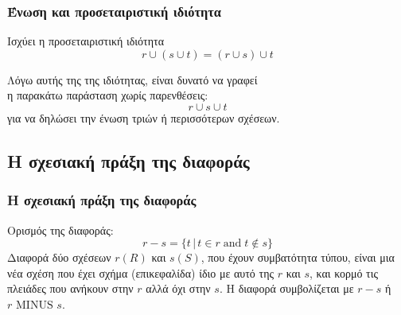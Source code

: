 \begin{frame}
\frametitle{Ένωση και προσεταιριστική ιδιότητα}
\begin{minipage}{\wE}
  \begin{block}{Ισχύει η προσεταιριστική ιδιότητα} \Large
    \[ r \cup (s \cup t) = (r \cup s) \cup t \]
  \end{block}
   Λόγω αυτής της της ιδιότητας, είναι δυνατό να γραφεί \\ η παρακάτω παράσταση χωρίς παρενθέσεις:
   \[
     r \cup s \cup t
   \]
   για να δηλώσει την ένωση τριών ή περισσότερων σχέσεων.
\end{minipage}
\end{frame}


\subsection[\textlatin{Difference}]{\textgreek{Η σχεσιακή πράξη της διαφοράς}}

\begin{frame}
\frametitle{Η σχεσιακή πράξη της διαφοράς}
\begin{minipage}{\wE}
\large
\begin{block}{Ορισμός της διαφοράς:}
  \[
     r - s = \{t \,|\, t \in r \; \mathrm{and} \; t \notin s \}
  \]
  {\bb Διαφορά} δύο σχέσεων $r(R)$ και $s(S)$, που έχουν συμβατότητα τύπου, είναι μια νέα σχέση
  που έχει σχήμα (επικεφαλίδα) ίδιο με αυτό της $r$ και $s$, και κορμό 
  τις πλειάδες που ανήκουν στην $r$ αλλά όχι στην $s$.
  Η διαφορά συμβολίζεται με $r - s$  ή {\en $r \text{ MINUS }  s$}.
\end{block}
\end{minipage}
\end{frame}


